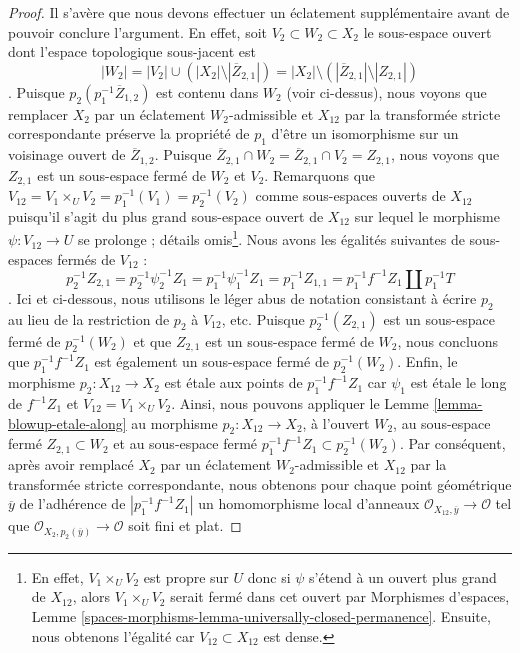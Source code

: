 \begin{proof}
\medskip\noindent
Il s'avère que nous devons effectuer un éclatement supplémentaire avant de pouvoir conclure l'argument. En effet, soit $V_2 \subset W_2 \subset X_2$ le sous-espace ouvert dont l'espace topologique sous-jacent est $$
|W_2| =
|V_2| \cup (|X_2| \setminus |\overline{Z}_{2, 1}|) =
|X_2| \setminus \left(|\overline{Z}_{2, 1}| \setminus |Z_{2, 1}|\right)
$$. Puisque $p_2(p_1^{-1}\overline{Z}_{1, 2})$ est contenu dans $W_2$ (voir ci-dessus), nous voyons que remplacer $X_2$ par un éclatement $W_2$-admissible et $X_{12}$ par la transformée stricte correspondante préserve la propriété de $p_1$ d'être un isomorphisme sur un voisinage ouvert de $\overline{Z}_{1, 2}$. Puisque $\overline{Z}_{2, 1} \cap W_2 = \overline{Z}_{2, 1} \cap V_2 = Z_{2, 1}$, nous voyons que $Z_{2, 1}$ est un sous-espace fermé de $W_2$ et $V_2$. Remarquons que $V_{12} = V_1 \times_U V_2 = p_1^{-1}(V_1) = p_2^{-1}(V_2)$ comme sous-espaces ouverts de $X_{12}$ puisqu'il s'agit du plus grand sous-espace ouvert de $X_{12}$ sur lequel le morphisme $\psi : V_{12} \to U$ se prolonge ; détails omis\footnote{En effet, $V_1 \times_U V_2$ est propre sur $U$ donc si $\psi$ s'étend à un ouvert plus grand de $X_{12}$, alors $V_1 \times_U V_2$ serait fermé dans cet ouvert par Morphismes d'espaces, Lemme \ref{spaces-morphisms-lemma-universally-closed-permanence}. Ensuite, nous obtenons l'égalité car $V_{12} \subset X_{12}$ est dense.}. Nous avons les égalités suivantes de sous-espaces fermés de $V_{12}$ : $$
p_2^{-1}Z_{2, 1} = p_2^{-1} \psi_2^{-1} Z_1 =
p_1^{-1} \psi_1^{-1} Z_1= p_1^{-1}Z_{1, 1} =
p_1^{-1}f^{-1}Z_1 \amalg p_1^{-1}T
$$. Ici et ci-dessous, nous utilisons le léger abus de notation consistant à écrire $p_2$ au lieu de la restriction de $p_2$ à $V_{12}$, etc. Puisque $p_2^{-1}(Z_{2, 1})$ est un sous-espace fermé de $p_2^{-1}(W_2)$ et que $Z_{2, 1}$ est un sous-espace fermé de $W_2$, nous concluons que $p_1^{-1}f^{-1}Z_1$ est également un sous-espace fermé de $p_2^{-1}(W_2)$. Enfin, le morphisme $p_2 : X_{12} \to X_2$ est \'etale aux points de $p_1^{-1}f^{-1}Z_1$ car $\psi_1$ est \'etale le long de $f^{-1}Z_1$ et $V_{12} = V_1 \times_U V_2$. Ainsi, nous pouvons appliquer le Lemme \ref{lemma-blowup-etale-along} au morphisme $p_2 : X_{12} \to X_2$, à l'ouvert $W_2$, au sous-espace fermé $Z_{2, 1} \subset W_2$ et au sous-espace fermé $p_1^{-1}f^{-1}Z_1 \subset p_2^{-1}(W_2)$. Par conséquent, après avoir remplacé $X_2$ par un éclatement $W_2$-admissible et $X_{12}$ par la transformée stricte correspondante, nous obtenons pour chaque point géométrique $\overline{y}$ de l'adhérence de $|p_1^{-1}f^{-1}Z_1|$ un homomorphisme local d'anneaux $\mathcal{O}_{X_{12}, \overline{y}} \to \mathcal{O}$ tel que $\mathcal{O}_{X_2, p_2(\overline{y})} \to \mathcal{O}$ soit fini et plat.


\end{proof}
